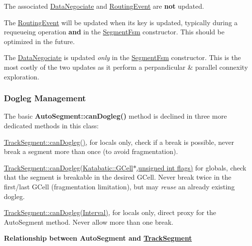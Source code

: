 The associated \hyperlink{classKite_1_1DataNegociate}{Data\+Negociate} and \hyperlink{classKite_1_1RoutingEvent}{Routing\+Event} are {\bfseries not} updated.
\begin{DoxyItemize}
\item The \hyperlink{classKite_1_1RoutingEvent}{Routing\+Event} will be updated when it\textquotesingle{}s key is updated, typically during a requeueing operation {\bfseries and} in the \hyperlink{classKite_1_1SegmentFsm}{Segment\+Fsm} constructor. This should be optimized in the future.
\item The \hyperlink{classKite_1_1DataNegociate}{Data\+Negociate} is updated {\itshape only} in the \hyperlink{classKite_1_1SegmentFsm}{Segment\+Fsm} constructor. This is the most costly of the two updates as it perform a perpandicular \& parallel connexity exploration.
\end{DoxyItemize}\hypertarget{classKite_1_1TrackSegment_secDogleg}{}\subsubsection{Dogleg Management}\label{classKite_1_1TrackSegment_secDogleg}
The basic \textbf{ Auto\+Segment\+::can\+Dogleg()} method is declined in three more dedicated methods in this class\+:
\begin{DoxyItemize}
\item \hyperlink{classKite_1_1TrackSegment_aa0bb6f1592688e942ff67e0ac318a4fd}{Track\+Segment\+::can\+Dogleg()}, for locals only, check if a break is possible, never break a segment more than once (to avoid fragmentation).
\item \hyperlink{classKite_1_1TrackSegment_a4f040cf33009e4886d401115c3bea838}{Track\+Segment\+::can\+Dogleg(\+Katabatic\+::\+G\+Cell$\ast$,unsigned int flags)} for globals, check that the segment is breakable in the desired G\+Cell. Never break twice in the first/last G\+Cell (fragmentation limitation), but may {\itshape reuse} an already existing dogleg.
\item \hyperlink{classKite_1_1TrackSegment_accb4c6a7ee2678a0cff4dbc4a7860fe1}{Track\+Segment\+::can\+Dogleg(\+Interval)}, for locals only, direct proxy for the Auto\+Segment method. Never allow more than one break.
\end{DoxyItemize}

{\bfseries Relationship between Auto\+Segment and \hyperlink{classKite_1_1TrackSegment}{Track\+Segment}}

